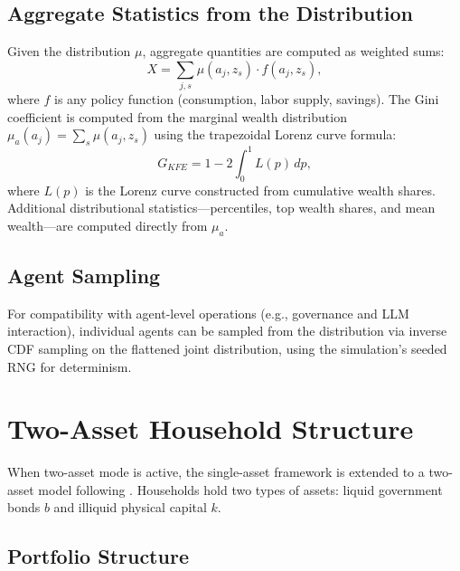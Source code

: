 \documentclass[12pt]{article}
\begin{document}
\subsection{Aggregate Statistics from the Distribution}

Given the distribution $\mu$, aggregate quantities are computed as weighted sums:
\begin{equation}\label{eq:kfe_aggregate}
  X = \sum_{j,s} \mu(a_j, z_s) \cdot f(a_j, z_s),
\end{equation}
where $f$ is any policy function (consumption, labor supply, savings). The Gini coefficient is computed from the marginal wealth distribution $\mu_a(a_j) = \sum_s \mu(a_j, z_s)$ using the trapezoidal Lorenz curve formula:
\begin{equation}\label{eq:kfe_gini}
  G_{KFE} = 1 - 2 \int_0^1 L(p)\, dp,
\end{equation}
where $L(p)$ is the Lorenz curve constructed from cumulative wealth shares. Additional distributional statistics---percentiles, top wealth shares, and mean wealth---are computed directly from $\mu_a$.

\subsection{Agent Sampling}

For compatibility with agent-level operations (e.g., governance and LLM interaction), individual agents can be sampled from the distribution via inverse CDF sampling on the flattened joint distribution, using the simulation's seeded RNG for determinism.


\section{Two-Asset Household Structure}\label{sec:two_asset}

When two-asset mode is active, the single-asset framework is extended to a two-asset model following \citet{kaplanmollviolante2018}. Households hold two types of assets: liquid government bonds $b$ and illiquid physical capital $k$.

\subsection{Portfolio Structure}
\end{document}
